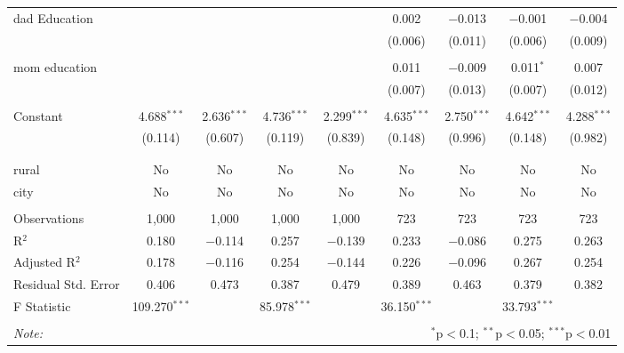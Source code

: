 \begin{sidewaystable}[!htbp]
\begin{tabular}{@{\extracolsep{5pt}}lcccccccc}
 dad Education &  &  &  &  & 0.002 & $-$0.013 & $-$0.001 & $-$0.004 \\ 
  &  &  &  &  & (0.006) & (0.011) & (0.006) & (0.009) \\ 
  & & & & & & & & \\ 
 mom education &  &  &  &  & 0.011 & $-$0.009 & 0.011$^{*}$ & 0.007 \\ 
  &  &  &  &  & (0.007) & (0.013) & (0.007) & (0.012) \\ 
  & & & & & & & & \\ 
 Constant & 4.688$^{***}$ & 2.636$^{***}$ & 4.736$^{***}$ & 2.299$^{***}$ & 4.635$^{***}$ & 2.750$^{***}$ & 4.642$^{***}$ & 4.288$^{***}$ \\ 
  & (0.114) & (0.607) & (0.119) & (0.839) & (0.148) & (0.996) & (0.148) & (0.982) \\ 
  & & & & & & & & \\ 
\hline \\[-1.8ex] 
rural & No & No & No & No & No & No & No & No \\ 
city & No & No & No & No & No & No & No & No \\ 
\hline \\[-1.8ex] 
Observations & 1,000 & 1,000 & 1,000 & 1,000 & 723 & 723 & 723 & 723 \\ 
R$^{2}$ & 0.180 & $-$0.114 & 0.257 & $-$0.139 & 0.233 & $-$0.086 & 0.275 & 0.263 \\ 
Adjusted R$^{2}$ & 0.178 & $-$0.116 & 0.254 & $-$0.144 & 0.226 & $-$0.096 & 0.267 & 0.254 \\ 
Residual Std. Error & 0.406 & 0.473 & 0.387 & 0.479 & 0.389 & 0.463 & 0.379 & 0.382 \\ 
F Statistic & 109.270$^{***}$ &  & 85.978$^{***}$ &  & 36.150$^{***}$ &  & 33.793$^{***}$ &  \\ 
\hline 
\hline \\[-1.8ex] 
\textit{Note:}  & \multicolumn{8}{r}{$^{*}$p$<$0.1; $^{**}$p$<$0.05; $^{***}$p$<$0.01} \\ 
\end{tabular} 
\end{sidewaystable} 


